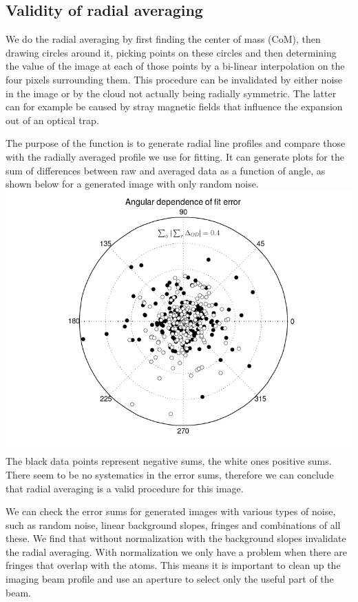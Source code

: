 \documentclass[letterpaper,10pt,english]{manual}
\begin{document}
\subsection{Validity of radial averaging}

We do the radial averaging by first finding the center of mass (CoM), then drawing circles around it, picking points on these circles and then determining the value of the image at each of those points by a bi-linear interpolation on the four pixels surrounding them. This procedure can be invalidated by either noise in the image or by the cloud not actually being radially symmetric. The latter can for example be caused by stray magnetic fields that influence the expansion out of an optical trap.

The purpose of the  function is to generate radial line profiles and compare those with the radially averaged profile we use for fitting. It can generate plots for the sum of differences between raw and averaged data as a function of angle, as shown below for a generated image with only random noise.
\includegraphics[width=400pt]{raderror_randomnoise.png}
The black data points represent negative sums, the white ones positive sums. There seem to be no systematics in the error sums, therefore we can conclude that radial averaging is a valid procedure for this image.

We can check the error sums for generated images with various types of noise, such as random noise, linear background slopes, fringes and combinations of all these. We find that without normalization with  the background slopes invalidate the radial averaging. With normalization we only have a problem when there are fringes that overlap with the atoms. This means it is important to clean up the imaging beam profile and use an aperture to select only the useful part of the beam.
\end{document}
